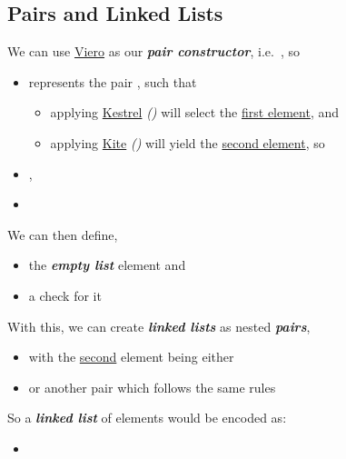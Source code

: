 \subsection*{Pairs and Linked Lists}

We can use \ul{Viero} as our \textbf{\textit{pair constructor}},
i.e.~, so

\begin{itemize}
\tightlist
\item
  represents the pair , such that

  \begin{itemize}
  \tightlist
  \item
    applying \ul{Kestrel} \textit{()} will select
    the \ul{first element}, and
  \item
    applying \ul{Kite} \textit{()} will yield the
    \ul{second element}, so
  \end{itemize}
\item
  ,
\item
\end{itemize}

We can then define,

\begin{itemize}
\tightlist
\item
  the \textbf{\textit{empty list}} element
   and
\item
  a check for it
\end{itemize}

With this, we can create \textbf{\textit{linked lists}} as nested
\textbf{\textit{pairs}},

\begin{itemize}
\tightlist
\item
  with the \ul{second} element being either 
\item
  or another pair which follows the same rules
\end{itemize}

So a \textbf{\textit{linked list}} of  elements
\iMbox{[x_{1}, \dots, x_{n}]} would be encoded as:

\begin{itemize}
\tightlist
\item
\end{itemize}
